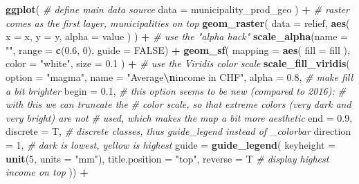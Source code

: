 \documentclass[
]{article}
\newenvironment{Shaded}{\begin{snugshade}}{\end{snugshade}}
\newcommand{\AttributeTok}[1]{\textcolor[rgb]{0.13,0.29,0.53}{#1}}
\newcommand{\CommentTok}[1]{\textcolor[rgb]{0.56,0.35,0.01}{\textit{#1}}}
\newcommand{\ConstantTok}[1]{\textcolor[rgb]{0.56,0.35,0.01}{#1}}
\newcommand{\DecValTok}[1]{\textcolor[rgb]{0.00,0.00,0.81}{#1}}
\newcommand{\FloatTok}[1]{\textcolor[rgb]{0.00,0.00,0.81}{#1}}
\newcommand{\FunctionTok}[1]{\textcolor[rgb]{0.13,0.29,0.53}{\textbf{#1}}}
\newcommand{\NormalTok}[1]{#1}
\newcommand{\SpecialCharTok}[1]{\textcolor[rgb]{0.81,0.36,0.00}{\textbf{#1}}}
\newcommand{\StringTok}[1]{\textcolor[rgb]{0.31,0.60,0.02}{#1}}
\begin{document}
\begin{Shaded}
\begin{Highlighting}[]
\FunctionTok{ggplot}\NormalTok{(}
  \CommentTok{\# define main data source}
  \AttributeTok{data =}\NormalTok{ municipality\_prod\_geo}
\NormalTok{) }\SpecialCharTok{+}
    \CommentTok{\# raster comes as the first layer, municipalities on top}
    \FunctionTok{geom\_raster}\NormalTok{(}
      \AttributeTok{data =}\NormalTok{ relief, }\FunctionTok{aes}\NormalTok{( }\AttributeTok{x =}\NormalTok{ x,   }\AttributeTok{y =}\NormalTok{ y,  }\AttributeTok{alpha =}\NormalTok{ value  ) ) }\SpecialCharTok{+}
    \CommentTok{\# use the "alpha hack"}
    \FunctionTok{scale\_alpha}\NormalTok{(}\AttributeTok{name =} \StringTok{""}\NormalTok{, }\AttributeTok{range =} \FunctionTok{c}\NormalTok{(}\FloatTok{0.6}\NormalTok{, }\DecValTok{0}\NormalTok{), }\AttributeTok{guide =} \ConstantTok{FALSE}\NormalTok{)  }\SpecialCharTok{+} 
  \FunctionTok{geom\_sf}\NormalTok{(}
    \AttributeTok{mapping =} \FunctionTok{aes}\NormalTok{(}
      \AttributeTok{fill =}\NormalTok{ fill}
\NormalTok{      ),}
    \AttributeTok{color =} \StringTok{"white"}\NormalTok{,}
    \AttributeTok{size =} \FloatTok{0.1}
\NormalTok{  ) }\SpecialCharTok{+}
  \CommentTok{\# use the Viridis color scale}
  \FunctionTok{scale\_fill\_viridis}\NormalTok{(}
    \AttributeTok{option =} \StringTok{"magma"}\NormalTok{,}
    \AttributeTok{name =} \StringTok{"Average}\SpecialCharTok{\textbackslash{}n}\StringTok{income in CHF"}\NormalTok{,}
    \AttributeTok{alpha =} \FloatTok{0.8}\NormalTok{, }\CommentTok{\# make fill a bit brighter}
    \AttributeTok{begin =} \FloatTok{0.1}\NormalTok{, }\CommentTok{\# this option seems to be new (compared to 2016):}
    \CommentTok{\# with this we can truncate the}
    \CommentTok{\# color scale, so that extreme colors (very dark and very bright) are not}
    \CommentTok{\# used, which makes the map a bit more aesthetic}
    \AttributeTok{end =} \FloatTok{0.9}\NormalTok{,}
    \AttributeTok{discrete =}\NormalTok{ T, }\CommentTok{\# discrete classes, thus guide\_legend instead of \_colorbar}
    \AttributeTok{direction =} \DecValTok{1}\NormalTok{, }\CommentTok{\# dark is lowest, yellow is highest}
    \AttributeTok{guide =} \FunctionTok{guide\_legend}\NormalTok{(}
     \AttributeTok{keyheight =} \FunctionTok{unit}\NormalTok{(}\DecValTok{5}\NormalTok{, }\AttributeTok{units =} \StringTok{"mm"}\NormalTok{),}
     \AttributeTok{title.position =} \StringTok{"top"}\NormalTok{,}
     \AttributeTok{reverse =}\NormalTok{ T }\CommentTok{\# display highest income on top}
\NormalTok{  )) }\SpecialCharTok{+}

\end{Highlighting}
\end{Shaded}
\end{document}

